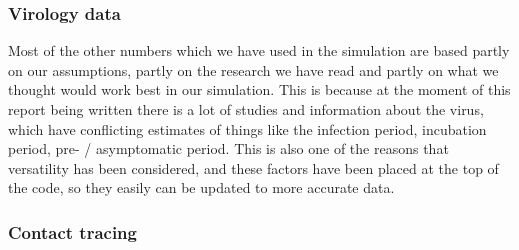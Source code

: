 \subsubsection{Virology data}
Most of the other numbers which we have used in the simulation are based partly on our assumptions, partly on the research we have read and partly on what we thought would work best in our simulation. This is because at the moment of this report being written there is a lot of studies and information about the virus, which have conflicting estimates of things like the infection period, incubation period, pre- / asymptomatic period. This is also one of the reasons that versatility has been considered, and these factors have been placed at the top of the code, so they easily can be updated to more accurate data.

\subsubsection{Contact tracing}










